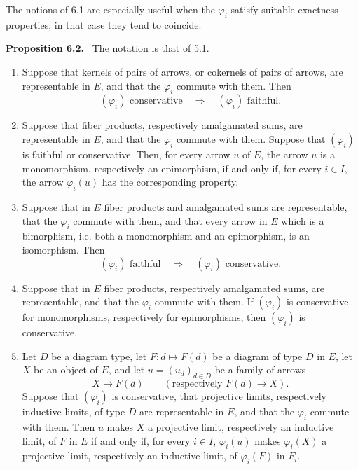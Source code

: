 \documentclass[11pt]{article}
\newenvironment{statement}[1]{\par\medskip\noindent\textbf{#1.}\ }{\par\medskip}
\begin{document}
The notions of 6.1 are especially useful when the $\varphi_i$ satisfy suitable exactness properties; in that case they tend to coincide.

\begin{statement}{Proposition 6.2}
The notation is that of 5.1.
\begin{enumerate}[label=(\roman*)]
\item Suppose that kernels of pairs of arrows, or cokernels of pairs of arrows, are representable in $E$, and that the $\varphi_i$ commute with them. Then
\[
(\varphi_i)\text{ conservative}\quad\Longrightarrow\quad (\varphi_i)\text{ faithful}.
\]

\item Suppose that fiber products, respectively amalgamated sums, are representable in $E$, and that the $\varphi_i$ commute with them. Suppose that $(\varphi_i)$ is faithful or conservative. Then, for every arrow $u$ of $E$, the arrow $u$ is a monomorphism, respectively an epimorphism, if and only if, for every $i\in I$, the arrow $\varphi_i(u)$ has the corresponding property.

\item Suppose that in $E$ fiber products and amalgamated sums are representable, that the $\varphi_i$ commute with them, and that every arrow in $E$ which is a bimorphism, i.e. both a monomorphism and an epimorphism, is an isomorphism. Then
\[
(\varphi_i)\text{ faithful}\quad\Longrightarrow\quad (\varphi_i)\text{ conservative}.
\]

\item Suppose that in $E$ fiber products, respectively amalgamated sums, are representable, and that the $\varphi_i$ commute with them. If $(\varphi_i)$ is conservative for monomorphisms, respectively for epimorphisms, then $(\varphi_i)$ is conservative.

\item Let $D$ be a diagram type, let $F:d\mapsto F(d)$ be a diagram of type $D$ in $E$, let $X$ be an object of $E$, and let $u=(u_d)_{d\in D}$ be a family of arrows
\[
X\longrightarrow F(d)\qquad (\text{respectively }F(d)\longrightarrow X).
\]
Suppose that $(\varphi_i)$ is conservative, that projective limits, respectively inductive limits, of type $D$ are representable in $E$, and that the $\varphi_i$ commute with them. Then $u$ makes $X$ a projective limit, respectively an inductive limit, of $F$ in $E$ if and only if, for every $i\in I$, $\varphi_i(u)$ makes $\varphi_i(X)$ a projective limit, respectively an inductive limit, of $\varphi_i(F)$ in $F_i$.
\end{enumerate}
\end{statement}
\end{document}
